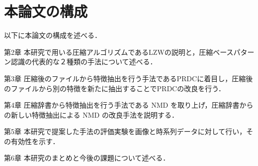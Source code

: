 \section{本論文の構成} %
\label{sec:本論文の構成}
以下に本論文の構成を述べる．

\begin{description}
	\item{第2章} 本研究で用いる圧縮アルゴリズムであるLZWの説明と，圧縮ベースパターン認識の代表的な２種類の手法について述べる．
	\item{第3章} 圧縮後のファイルから特徴抽出を行う手法であるPRDCに着目し，圧縮後のファイルから別の特徴を新たに抽出することでPRDCの改良を行う．
	\item{第4章} 圧縮辞書から特徴抽出を行う手法である NMD を取り上げ，圧縮辞書からの新しい特徴抽出による NMD の改良手法を説明する．
	\item{第5章} 本研究で提案した手法の評価実験を画像と時系列データに対して行い，その有効性を示す．
	\item{第6章} 本研究のまとめと今後の課題について述べる．
\end{description}
